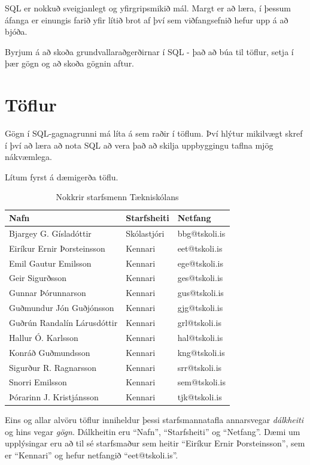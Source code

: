 SQL er nokkuð sveigjanlegt og yfirgripsmikið mál. 
Margt er að læra, í þessum áfanga er einungis farið yfir lítið brot af því sem viðfangsefnið hefur upp á að bjóða.

Byrjum á að skoða grundvallaraðgerðirnar í SQL - það að búa til töflur, setja í þær gögn og að skoða gögnin aftur.
\section{Töflur}
Gögn í SQL-gagnagrunni má líta á sem raðir í töflum. Því hlýtur mikilvægt skref í því að læra að nota SQL að vera það að skilja uppbyggingu taflna mjög nákvæmlega.

Lítum fyrst á dæmigerða töflu.

\begin{table}
\centering
\caption{Nokkrir starfsmenn Tækniskólans}
\label{tafla:starfsmenn_ts}
\begin{tabular}{lll}
\toprule
Nafn&Starfsheiti&Netfang\\
\midrule
Bjargey G. Gísladóttir&Skólastjóri&bbg@tskoli.is\\
Eiríkur Ernir Þorsteinsson&Kennari&eet@tskoli.is\\
Emil Gautur Emilsson&Kennari&ege@tskoli.is\\
Geir Sigurðsson&Kennari&ges@tskoli.is\\
Gunnar Þórunnarson&Kennari&gus@tskoli.is\\
Guðmundur Jón Guðjónsson&Kennari&gjg@tskoli.is\\
Guðrún Randalín Lárusdóttir&Kennari&grl@tskoli.is\\
Hallur Ó. Karlsson&Kennari&hal@tskoli.is\\
Konráð Guðmundsson&Kennari&kng@tskoli.is\\
Sigurður R. Ragnarsson&Kennari&srr@tskoli.is\\
Snorri Emilsson&Kennari&sem@tskoli.is\\
Þórarinn J. Kristjánsson&Kennari&tjk@tskoli.is\\
\bottomrule
\end{tabular}
\end{table}
Eins og allar alvöru töflur inniheldur þessi starfsmannatafla annarsvegar \emph{dálkheiti} og hins vegar \emph{gögn}. Dálkheitin eru ``Nafn'', ``Starfsheiti'' og ``Netfang''. Dæmi um upplýsingar eru að til sé starfsmaður sem heitir ``Eiríkur Ernir Þorsteinsson'', sem er ``Kennari'' og hefur netfangið ``eet@tskoli.is''. 

